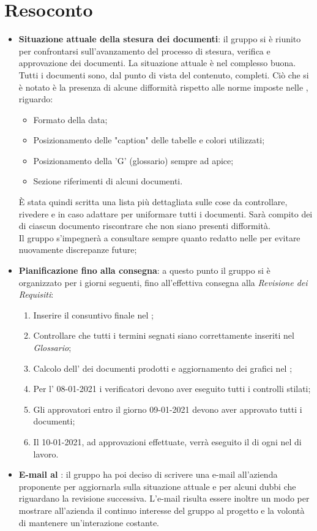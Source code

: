 \section{Resoconto}
\begin{itemize}
\item \textbf{Situazione attuale della stesura dei documenti}: il gruppo si è riunito per confrontarsi sull'avanzamento del processo di stesura, verifica e approvazione dei documenti. La situazione attuale è nel complesso buona. Tutti i documenti sono, dal punto di vista del contenuto, completi. Ciò che si è notato è la presenza di alcune difformità rispetto alle norme imposte nelle \NdPv{}, riguardo:
	\begin{itemize}
		\item Formato della data;
		\item Posizionamento delle "caption" delle tabelle e colori utilizzati;
		\item Posizionamento della 'G' (glossario) sempre ad apice;
		\item Sezione riferimenti di alcuni documenti.
	\end{itemize} 
È stata quindi scritta una lista più dettagliata sulle cose da controllare, rivedere e in caso adattare per uniformare tutti i documenti. Sarà compito dei  di ciascun documento riscontrare che non siano presenti difformità. \\
Il gruppo s'impegnerà a consultare sempre quanto redatto nelle \NdPv{} per evitare nuovamente discrepanze future;

\item \textbf{Pianificazione fino alla consegna}: a questo punto il gruppo si è organizzato per i giorni seguenti, fino all'effettiva consegna alla \textit{Revisione dei Requisiti}:
	\begin{enumerate}
		\item Inserire il consuntivo finale nel \PdPv{};
		\item Controllare che tutti i termini segnati siano correttamente inseriti nel \textit{Glossario};
		\item Calcolo dell' dei documenti prodotti e aggiornamento dei grafici nel \PdQv{};
		\item Per l' 08-01-2021 i verificatori devono aver eseguito tutti i controlli stilati;
		\item Gli approvatori entro il giorno 09-01-2021 devono aver approvato tutti i documenti;
		\item Il 10-01-2021, ad approvazioni effettuate, verrà eseguito il  di ogni  nel  di lavoro.
	\end{enumerate}
	
\item \textbf{E-mail al }: il gruppo ha poi deciso di scrivere una e-mail all'azienda proponente per aggiornarla sulla situazione attuale e per alcuni dubbi che riguardano la revisione successiva. L'e-mail risulta essere inoltre un modo per mostrare all'azienda il continuo interesse del gruppo al progetto e la volontà di mantenere un'interazione costante.
\end{itemize}
\newpage
